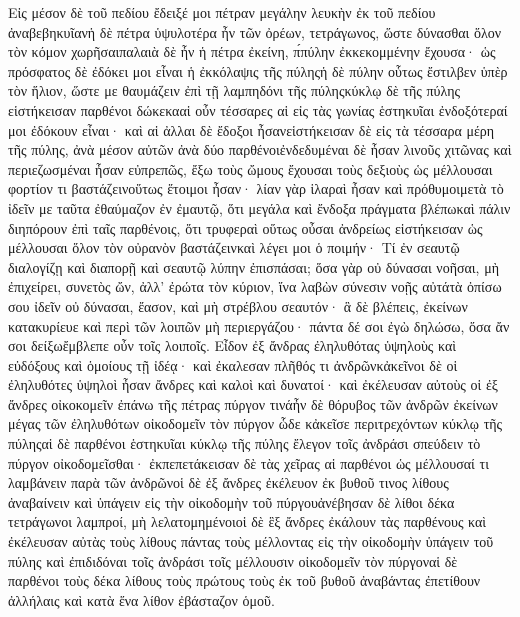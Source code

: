 Εἰς μέσον δὲ τοῦ πεδίου ἔδειξέ μοι πέτραν μεγάλην λευκὴν ἐκ τοῦ πεδίου ἀναβεβηκυῖανἡ δὲ πέτρα ὑψυλοτέρα ἦν τῶν ὀρέων, τετράγωνος, ὥστε δύνασθαι ὅλον τὸν κόμον χωρῆσαιπαλαιὰ δὲ ἦν ἡ πέτρα ἐκείνη, π́πύλην ἐκκεκομμένην ἔχουσα· ὡς πρόσφατος δὲ ἐδόκει μοι εἶναι ἡ ἐκκόλαψις τῆς πύληςἡ δὲ πύλην οὗτως ἔστιλβεν ὑπὲρ τὸν ἥλιον, ὥστε με θαυμάζειν ἐπὶ τῇ λαμπηδόνι τῆς πύληςκύκλῳ δὲ τῆς πύλης εἱστήκεισαν παρθένοι δώκεκααἱ οὖν τέσσαρες αἱ εἰς τὰς γωνίας ἑστηκυῖαι ἐνδοξότεραί μοι ἐδόκουν εἶναι· καὶ αἱ ἀλλαι δὲ ἔδοξοι ἦσανεἱστήκεισαν δὲ εἰς τὰ τέσσαρα μέρη τῆς πύλης, ἀνὰ μέσον αὐτῶν ἀνὰ δύο παρθένοιἐνδεδυμέναι δὲ ἦσαν λινοῦς χιτῶνας καὶ περιεζωσμέναι ἦσαν εὐπρεπῶς, ἔξω τοὺς ὤμους ἔχουσαι τοὺς δεξιοὺς ὡς μέλλουσαι φορτίον τι βαστάζεινοὕτως ἕτοιμοι ἦσαν· λίαν γὰρ ἱλαραὶ ἦσαν καὶ πρόθυμοιμετὰ τὸ ἰδεῖν με ταῦτα ἐθαύμαζον ἐν ἐμαυτῷ, ὅτι μεγάλα καὶ ἔνδοξα πράγματα βλέπωκαὶ πάλιν διηπόρουν ἐπὶ ταῖς παρθένοις, ὅτι τρυφεραὶ οὕτως οὖσαι ἀνδρείως εἱστήκεισαν ὡς μέλλουσαι ὅλον τὸν οὐρανὸν βαστάζεινκαὶ λέγει μοι ὁ ποιμήν· Τί ἐν σεαυτῷ διαλογίζῃ καὶ διαπορῇ καὶ σεαυτῷ λύπην ἐπισπάσαι; ὅσα γὰρ οὐ δύνασαι νοῆσαι, μὴ ἐπιχείρει, συνετὸς ὤν, ἀλλ’ ἐρώτα τὸν κύριον, ἵνα λαβὼν σύνεσιν νοῇς αὐτάτὰ ὀπίσω σου ἰδεῖν οὐ δύνασαι, ἔασον, καὶ μὴ στρέβλου σεαυτόν· ἃ δὲ βλέπεις, ἐκείνων κατακυρίευε καὶ περὶ τῶν λοιπῶν μὴ περιεργάζου· πάντα δέ σοι ἐγὼ δηλώσω, ὅσα ἄν σοι δείξωἔμβλεπε οὖν τοῖς λοιποῖς.
Εἶδον ἐξ ἄνδρας ἐληλυθότας ὑψηλοὺς καὶ εὐδόξους καὶ ὁμοίους τῇ ἰδέᾳ· καὶ ἐκαλεσαν πλῆθός τι ἀνδρῶνκἀκεῖνοι δὲ οἱ ἐληλυθότες ὑψηλοὶ ἦσαν ἄνδρες καὶ καλοὶ καὶ δυνατοί· καὶ ἐκέλευσαν αὐτοὺς οἱ ἐξ ἄνδρες οἰκοκομεῖν ἐπάνω τῆς πέτρας πύργον τινάἦν δὲ θόρυβος τῶν ἀνδρῶν ἐκείνων μέγας τῶν ἐληλυθότων οἰκοδομεῖν τὸν πύργον ὧδε κἀκεῖσε περιτρεχόντων κύκλῳ τῆς πύληςαἱ δὲ παρθένοι ἑστηκυῖαι κύκλῳ τῆς πύλης ἔλεγον τοῖς ἀνδράσι σπεύδειν τὸ πύργον οἰκοδομεῖσθαι· ἐκπεπετάκεισαν δὲ τὰς χεῖρας αἱ παρθένοι ὡς μέλλουσαί τι λαμβάνειν παρὰ τῶν ἀνδρῶνοἱ δὲ ἐξ ἄνδρες ἐκέλευον ἐκ βυθοῦ τινος λίθους ἀναβαίνειν καὶ ὑπάγειν εἰς τὴν οἰκοδομὴν τοῦ πύργουἀνέβησαν δὲ λίθοι δέκα τετράγωνοι λαμπροί, μὴ λελατομημένοιοἱ δὲ ἓξ ἄνδρες ἐκάλουν τὰς παρθένους καὶ ἐκέλευσαν αὐτὰς τοὺς λίθους πάντας τοὺς μέλλοντας εἰς τὴν οἰκοδομὴν ὑπάγειν τοῦ πύλης καὶ ἐπιδιδόναι τοῖς ἀνδράσι τοῖς μέλλουσιν οἰκοδομεῖν τὸν πύργοναἱ δὲ παρθένοι τοὺς δέκα λίθους τοὺς πρώτους τοὺς ἐκ τοῦ βυθοῦ ἀναβάντας ἐπετίθουν ἀλλήλαις καὶ κατὰ ἕνα λίθον ἐβάσταζον ὁμοῦ.
